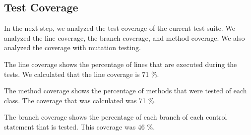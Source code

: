 \documentclass[]{article}
\begin{document}
\subsection{Test Coverage}

In the next step, we analyzed the test coverage of the current test suite. We analyzed the line coverage, the branch coverage, and method coverage. We also analyzed the coverage with mutation testing. 

The line coverage shows the percentage of lines that are executed during the tests. We calculated that the line coverage is 71 \%. 

The method coverage shows the percentage of methods that were tested of each class. The coverage that was calculated was 71 \%. 

The branch coverage shows the percentage of each branch of each control statement that is tested. This coverage was 46 \%. 
\end{document}
